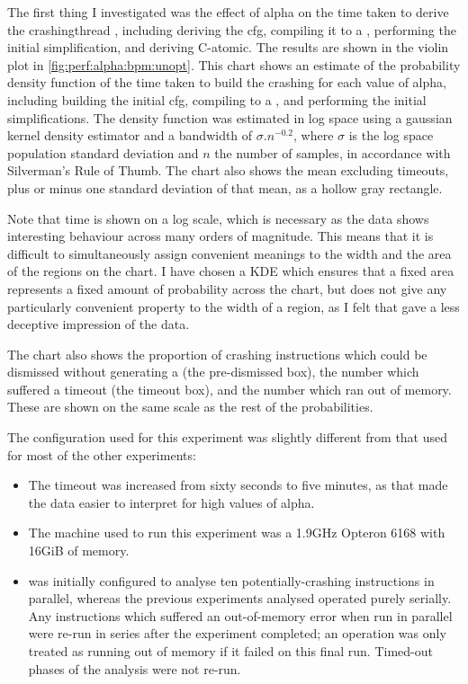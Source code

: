 The first thing I investigated was the effect of \gls{alpha} on the
time taken to derive the \gls{crashingthread} {\StateMachines},
including deriving the \gls{cfg}, compiling it to a {\StateMachine},
performing the initial simplification, and deriving C-atomic.  The
results are shown in the violin plot in
\autoref{fig:perf:alpha:bpm:unopt}.  This chart shows an estimate
of the probability density function of the time taken to build the
crashing {\StateMachines} for each value of \gls{alpha}, including
building the initial \gls{cfg}, compiling to a {\StateMachine}, and
performing the initial simplifications.  The density function was
estimated in log space using a gaussian kernel density estimator and a
bandwidth of $\sigma.n^{-0.2}$, where $\sigma$ is the log space
population standard deviation and $n$ the number of samples, in
accordance with Silverman's Rule of Thumb\needCite{}.  The chart also
shows the mean excluding timeouts, plus or minus one standard
deviation of that mean, as a hollow gray rectangle.

Note that time is shown on a log scale, which is necessary as the data
shows interesting behaviour across many orders of magnitude.  This
means that it is difficult to simultaneously assign convenient
meanings to the width and the area of the regions on the chart.  I
have chosen a KDE which ensures that a fixed area represents a fixed
amount of probability across the chart, but does not give any
particularly convenient property to the width of a region, as I felt
that gave a less deceptive impression of the data.

The chart also shows the proportion of crashing instructions which
could be dismissed without generating a {\StateMachine} (the
pre-dismissed box), the number which suffered a timeout (the timeout
box), and the number which ran out of memory.  These are shown on the
same scale as the rest of the probabilities.

The configuration used for this experiment was slightly different from
that used for most of the other experiments:

\begin{itemize}
\item The timeout was increased from sixty seconds to five minutes, as
  that made the data easier to interpret for high values of
  \gls{alpha}.
\item The machine used to run this experiment was a 1.9GHz Opteron
  6168 with 16GiB of memory.
\item {\Implementation} was initially configured to analyse ten
  potentially-crashing instructions in parallel, whereas the previous
  experiments analysed operated purely serially.  Any instructions
  which suffered an out-of-memory error when run in parallel were
  re-run in series after the experiment completed; an operation was
  only treated as running out of memory if it failed on this final
  run.  Timed-out phases of the analysis were not re-run.
\end{itemize}

